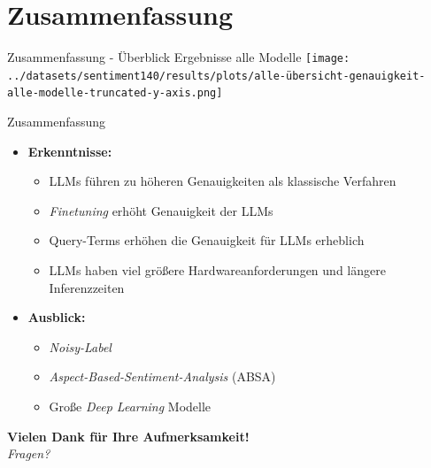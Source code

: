 \documentclass[aspectratio=169]{beamer} %
\begin{document}
\section{Zusammenfassung}

\begin{frame}{Zusammenfassung - Überblick Ergebnisse alle Modelle}
    \centering
    \texttt{[image: ../datasets/sentiment140/results/plots/alle-übersicht-genauigkeit-alle-modelle-truncated-y-axis.png]}
\end{frame}

\begin{frame}{Zusammenfassung}
  \normalsize
      \begin{itemize}
        \item \textbf{Erkenntnisse:}
        \begin{itemize}
            \item LLMs führen zu höheren Genauigkeiten als klassische Verfahren
            \item \textit{Finetuning} erhöht Genauigkeit der LLMs
            \item Query-Terms erhöhen die Genauigkeit für LLMs erheblich
            \item LLMs haben viel größere Hardwareanforderungen und längere Inferenzzeiten
        \end{itemize}
        \vspace{0.4cm}
        \item \textbf{Ausblick:}
        \begin{itemize}
            \item \textit{Noisy-Label}
            \item \textit{Aspect-Based-Sentiment-Analysis} (ABSA)
            \item Große \textit{Deep Learning} Modelle
        \end{itemize}
    \end{itemize}

  \vspace{0.5cm}
  \centering
  \pause
  {\large \textbf{Vielen Dank für Ihre Aufmerksamkeit!}} \\[0.1cm]
  \textit{Fragen?}
\end{frame}
\end{document}

